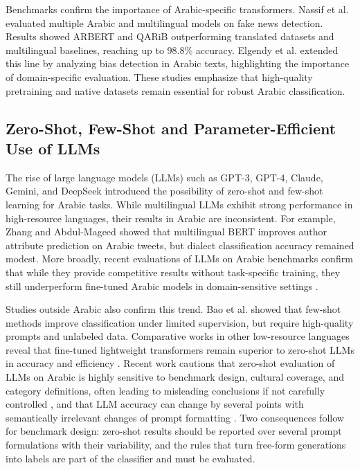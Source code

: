 \documentclass[preprint,12pt,authoryear]{elsarticle}
\newif\ifrevmarkup
\DeclareRobustCommand{\rev}[1]{\ifrevmarkup{\color{blue}#1}\else#1\fi}
\begin{document}
Benchmarks confirm the importance of Arabic-specific transformers. Nassif et al. \cite{nassif2022arabic} evaluated multiple Arabic and multilingual models on fake news detection. Results showed ARBERT and QARiB outperforming translated datasets and multilingual baselines, reaching up to 98.8\% accuracy. Elgendy et al. \cite{elgendy2024toxicity} extended this line by analyzing bias detection in Arabic texts, highlighting the importance of domain-specific evaluation. These studies emphasize that high-quality pretraining and native datasets remain essential for robust Arabic classification.

\subsection{\rev{Zero-Shot, Few-Shot and Parameter-Efficient Use of LLMs}}
The rise of large language models (LLMs) such as GPT-3, GPT-4, Claude, Gemini, and DeepSeek introduced the possibility of zero-shot and few-shot learning for Arabic tasks. While multilingual LLMs exhibit strong performance in high-resource languages, their results in Arabic are inconsistent. For example, Zhang and Abdul-Mageed \cite{zhang2019bert} showed that multilingual BERT improves author attribute prediction on Arabic tweets, but dialect classification accuracy remained modest. More broadly, recent evaluations of LLMs on Arabic benchmarks confirm that while they provide competitive results without task-specific training, they still underperform fine-tuned Arabic models in domain-sensitive settings \cite{baniata2023transformer,hossain2024transnet}.

Studies outside Arabic also confirm this trend. Bao et al. \cite{bao2019few} showed that few-shot methods improve classification under limited supervision, but require high-quality prompts and unlabeled data. Comparative works in other low-resource languages reveal that fine-tuned lightweight transformers remain superior to zero-shot LLMs in accuracy and efficiency \cite{ali2022deep}. \rev{Recent work cautions that zero-shot evaluation of LLMs on Arabic is highly sensitive to benchmark design, cultural coverage, and category definitions, often leading to misleading conclusions if not carefully controlled \cite{mansour2023sarcasm,al2025need}, and that LLM accuracy can change by several points with semantically irrelevant changes of prompt formatting \cite{sclar2024quantifying}.} \rev{Two consequences follow for benchmark design: zero-shot results should be reported over several prompt formulations with their variability, and the rules that turn free-form generations into labels are part of the classifier and must be evaluated.}
\end{document}
